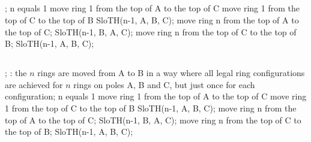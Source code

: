 \subsection{}
\Prog\qq     %
; \qq 
\If n equals 1 \Then\qq
move ring 1 from the top of A to the top of C\qq
move ring 1 from the top of C to the top of B\qq
\Else\qq
SloTH(n-1, A, B, C);\qq
move ring n from the top of A to the top of C;\qq
SloTH(n-1, B, A, C);\qq
move ring n from the top of C to the top of B;\qq
SloTH(n-1, A, B, C);\qq
\Endif\qq
\Fini

\subsection{}
\Prog\qq     %
; \qq 
\OUTPUT: the $n$ rings are moved from A to B in a way where all legal ring configurations are achieved for $n$ rings on poles A, B and C, but just once for each configuration;\p
\If n equals 1 \Then\p
move ring 1 from the top of A to the top of C\p
move ring 1 from the top of C to the top of B\p
\Else\p
SloTH(n-1, A, B, C); \p
move ring n from the top of A to the top of C;\p
SloTH(n-1, B, A, C); \p
move ring n from the top of C to the top of B;\p
SloTH(n-1, A, B, C); \p
\Endif\qq
\Fini




